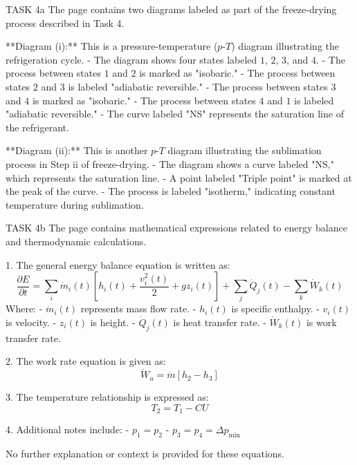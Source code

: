 TASK 4a  
The page contains two diagrams labeled as part of the freeze-drying process described in Task 4.  

**Diagram (i):**  
This is a pressure-temperature (\( p \)-\( T \)) diagram illustrating the refrigeration cycle.  
- The diagram shows four states labeled \( 1 \), \( 2 \), \( 3 \), and \( 4 \).  
- The process between states \( 1 \) and \( 2 \) is marked as "isobaric."  
- The process between states \( 2 \) and \( 3 \) is labeled "adiabatic reversible."  
- The process between states \( 3 \) and \( 4 \) is marked as "isobaric."  
- The process between states \( 4 \) and \( 1 \) is labeled "adiabatic reversible."  
- The curve labeled "NS" represents the saturation line of the refrigerant.  

**Diagram (ii):**  
This is another \( p \)-\( T \) diagram illustrating the sublimation process in Step ii of freeze-drying.  
- The diagram shows a curve labeled "NS," which represents the saturation line.  
- A point labeled "Triple point" is marked at the peak of the curve.  
- The process is labeled "isotherm," indicating constant temperature during sublimation.  

TASK 4b  
The page contains mathematical expressions related to energy balance and thermodynamic calculations.  

1. The general energy balance equation is written as:  
\[
\frac{\partial E}{\partial t} = \sum_i \dot{m}_i(t) \left[ h_i(t) + \frac{v_i^2(t)}{2} + g z_i(t) \right] + \sum_j \dot{Q}_j(t) - \sum_k \dot{W}_k(t)
\]  
Where:  
- \( \dot{m}_i(t) \) represents mass flow rate.  
- \( h_i(t) \) is specific enthalpy.  
- \( v_i(t) \) is velocity.  
- \( z_i(t) \) is height.  
- \( \dot{Q}_j(t) \) is heat transfer rate.  
- \( \dot{W}_k(t) \) is work transfer rate.  

2. The work rate equation is given as:  
\[
\dot{W}_u = \dot{m} \left[ h_2 - h_3 \right]
\]  

3. The temperature relationship is expressed as:  
\[
T_2 = T_1 - CU
\]  

4. Additional notes include:  
- \( p_1 = p_2 \)  
- \( p_3 = p_4 = \Delta p_{\text{min}} \)  

No further explanation or context is provided for these equations.